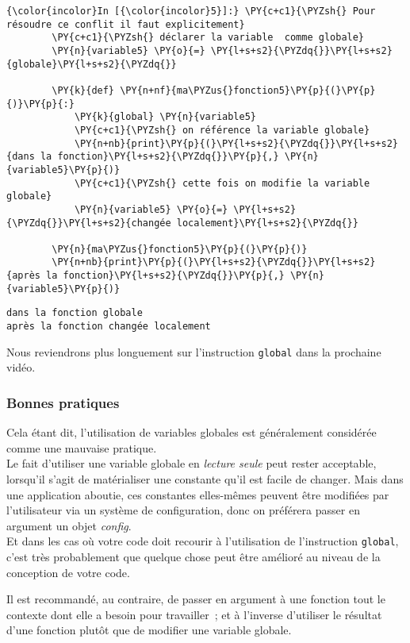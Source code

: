     \begin{Verbatim}[commandchars=\\\{\}]
{\color{incolor}In [{\color{incolor}5}]:} \PY{c+c1}{\PYZsh{} Pour résoudre ce conflit il faut explicitement}
        \PY{c+c1}{\PYZsh{} déclarer la variable  comme globale}
        \PY{n}{variable5} \PY{o}{=} \PY{l+s+s2}{\PYZdq{}}\PY{l+s+s2}{globale}\PY{l+s+s2}{\PYZdq{}}
        
        \PY{k}{def} \PY{n+nf}{ma\PYZus{}fonction5}\PY{p}{(}\PY{p}{)}\PY{p}{:}
            \PY{k}{global} \PY{n}{variable5}
            \PY{c+c1}{\PYZsh{} on référence la variable globale}
            \PY{n+nb}{print}\PY{p}{(}\PY{l+s+s2}{\PYZdq{}}\PY{l+s+s2}{dans la fonction}\PY{l+s+s2}{\PYZdq{}}\PY{p}{,} \PY{n}{variable5}\PY{p}{)}
            \PY{c+c1}{\PYZsh{} cette fois on modifie la variable globale}
            \PY{n}{variable5} \PY{o}{=} \PY{l+s+s2}{\PYZdq{}}\PY{l+s+s2}{changée localement}\PY{l+s+s2}{\PYZdq{}}
        
        \PY{n}{ma\PYZus{}fonction5}\PY{p}{(}\PY{p}{)}
        \PY{n+nb}{print}\PY{p}{(}\PY{l+s+s2}{\PYZdq{}}\PY{l+s+s2}{après la fonction}\PY{l+s+s2}{\PYZdq{}}\PY{p}{,} \PY{n}{variable5}\PY{p}{)}
\end{Verbatim}


    \begin{Verbatim}[commandchars=\\\{\}]
dans la fonction globale
après la fonction changée localement

    \end{Verbatim}

    Nous reviendrons plus longuement sur l'instruction \texttt{global} dans
la prochaine vidéo.

    \hypertarget{bonnes-pratiques}{%
\subsubsection{Bonnes pratiques}\label{bonnes-pratiques}}

    Cela étant dit, l'utilisation de variables globales est généralement
considérée comme une mauvaise pratique.\\

Le fait d'utiliser une variable globale en \emph{lecture seule} peut
rester acceptable, lorsqu'il s'agit de matérialiser une constante qu'il
est facile de changer. Mais dans une application aboutie, ces constantes
elles-mêmes peuvent être modifiées par l'utilisateur via un système de
configuration, donc on préférera passer en argument un objet
\emph{config}.\\

Et dans les cas où votre code doit recourir à l'utilisation de
l'instruction \texttt{global}, c'est très probablement que quelque chose
peut être amélioré au niveau de la conception de votre code.

Il est recommandé, au contraire, de passer en argument à une fonction
tout le contexte dont elle a besoin pour travailler~; et à l'inverse
d'utiliser le résultat d'une fonction plutôt que de modifier une
variable globale.\\